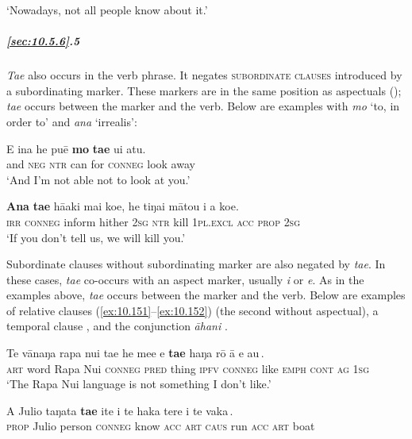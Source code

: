 \glt 
‘Nowadays, not all people know about it.’ \textstyleExampleref{[R647.206]} 
\z

\subparagraph{\ref{sec:10.5.6}.5} \textit{Ta{\ꞌ}e} also occurs in the verb phrase. It negates \textsc{subordinate clauses} introduced by a subordinating marker. These markers are in the same position as aspectuals (); \textit{\mbox{ta{\ꞌ}e}} occurs between the marker and the verb. Below are examples with \textit{mo} ‘to, in order to’ and \textit{ana} ‘irrealis’:

\ea\label{ex:10.149}
\gll {\ꞌ}E {\ꞌ}ina he puē \textbf{mo} \textbf{ta{\ꞌ}e} u{\ꞌ}i atu. \\
and \textsc{neg} \textsc{ntr} can for \textsc{conneg} look away \\

\glt 
‘And I’m not able not to look at you.’ \textstyleExampleref{[R308.023]} 
\z

\ea\label{ex:10.150}
\gll \textbf{Ana} \textbf{ta{\ꞌ}e} hā{\ꞌ}aki mai koe, he tiŋa{\ꞌ}i mātou i a koe. \\
\textsc{irr} \textsc{conneg} inform hither \textsc{2sg} \textsc{ntr} kill \textsc{1pl.excl} \textsc{acc} \textsc{prop} \textsc{2sg} \\

\glt 
‘If you don’t tell us, we will kill you.’ \textstyleExampleref{[Mtx-7-21.030]}
\z

Subordinate clauses without subordinating marker are also negated by \textit{ta{\ꞌ}e}. In these cases, \textit{ta{\ꞌ}e} co-occurs with an aspect marker, usually \textit{i} or \textit{e}. As in the examples above, \textit{ta{\ꞌ}e} occurs between the marker and the verb. Below are examples of relative clauses (\ref{ex:10.151}–\ref{ex:10.152}) (the second without aspectual), a temporal clause , and the conjunction \textit{{\ꞌ}āhani} .

\ea\label{ex:10.151}
\gll Te vānaŋa rapa nui ta{\ꞌ}e he me{\ꞌ}e {\ob}e \textbf{ta{\ꞌ}e} haŋa rō {\ꞌ}ā e au\,{\cb}. \\
\textsc{art} word Rapa Nui \textsc{conneg} \textsc{pred} thing {\db}\textsc{ipfv} \textsc{conneg} like \textsc{emph} \textsc{cont} \textsc{ag} \textsc{1sg} \\

\glt 
‘The Rapa Nui language is not something I don’t like.’ \textstyleExampleref{[R648.251]} 
\z

\ea\label{ex:10.152}
\gll A Julio taŋata {\ob}\textbf{ta{\ꞌ}e} {\ꞌ}ite i te haka tere i te vaka\,{\cb}. \\
\textsc{prop} Julio person {\db}\textsc{conneg} know \textsc{acc} \textsc{art} \textsc{caus} run \textsc{acc} \textsc{art} boat \\

